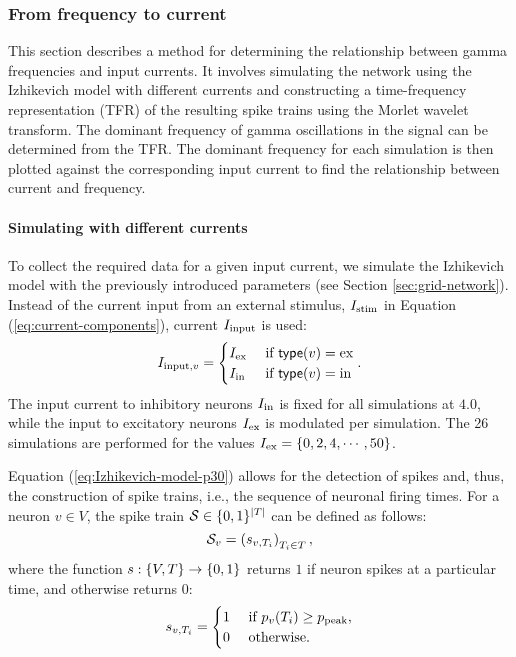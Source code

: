 \subsubsection{From frequency to current}

This section describes a method for determining the relationship between gamma frequencies and input currents. It involves simulating the network using the Izhikevich model with different currents and constructing a time-frequency representation (TFR) of the resulting spike trains using the Morlet wavelet transform. The dominant frequency of gamma oscillations in the signal can be determined from the TFR. The dominant frequency for each simulation is then plotted against the corresponding input current to find the relationship between current and frequency.

\paragraph{Simulating with different currents}

To collect the required data for a given input current, we simulate the Izhikevich model with the previously introduced parameters (see Section \ref{sec:grid-network}). Instead of the current input from an external stimulus, $I_{\mathrm{stim}}$ in Equation (\ref{eq:current-components}), current $I_{\mathrm{input}}$ is used:
\begin{equation}
    I_{\mathrm{input}, v} = \begin{cases}
        I_{\mathrm{ex}} & \text{ if } \mathsf{type}(v) = \mathrm{ex} \\
        I_{\mathrm{in}} & \text{ if } \mathsf{type}(v) = \mathrm{in}
    \end{cases}.
\end{equation}
The input current to inhibitory neurons $I_{\mathrm{in}}$ is fixed for all simulations at $4.0$, while the input to excitatory neurons $I_{\mathrm{ex}}$ is modulated per simulation. The 26 simulations are performed for the values $I_{\mathrm{ex}} = \{ 0, 2, 4, \cdots, 50 \}$.

Equation (\ref{eq:Izhikevich-model-p30}) allows for the detection of spikes and, thus, the construction of spike trains, i.e., the sequence of neuronal firing times. For a neuron $v \in V$, the spike train $\mathcal{S} \in \{0, 1\}^{|T|}$ can be defined as follows:
\begin{equation}
    \mathcal{S}_v = 
    \left( 
        s_{v, T_i}
    \right)_{T_i \in T},
\end{equation}
where the function $s: \{V, T\} \to \{0, 1\}$ returns $1$ if neuron spikes at a particular time, and otherwise returns $0$:
\begin{equation}
    s_{v, T_i} = \begin{cases}
        1 &\text{ if } p_v(T_i) \geq p_{\mathrm{peak}}
        , \\
        0 &\text{ otherwise}.
    \end{cases}
\end{equation}

